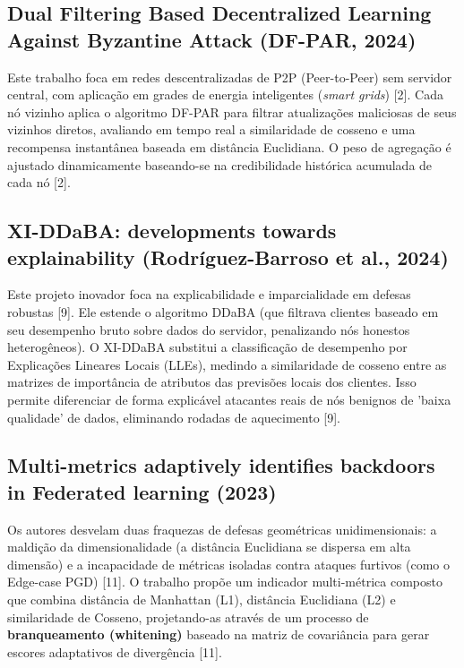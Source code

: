\documentclass[11pt,a4paper]{article}
\begin{document}
\subsection{Dual Filtering Based Decentralized Learning Against Byzantine Attack (DF-PAR, 2024)}
Este trabalho foca em redes descentralizadas de P2P (Peer-to-Peer) sem servidor central, com aplicação em grades de energia inteligentes (\textit{smart grids}) [2]. Cada nó vizinho aplica o algoritmo DF-PAR para filtrar atualizações maliciosas de seus vizinhos diretos, avaliando em tempo real a similaridade de cosseno e uma recompensa instantânea baseada em distância Euclidiana. O peso de agregação é ajustado dinamicamente baseando-se na credibilidade histórica acumulada de cada nó [2].

\subsection{XI-DDaBA: developments towards explainability (Rodríguez-Barroso et al., 2024)}
Este projeto inovador foca na explicabilidade e imparcialidade em defesas robustas [9]. Ele estende o algoritmo DDaBA (que filtrava clientes baseado em seu desempenho bruto sobre dados do servidor, penalizando nós honestos heterogêneos). O XI-DDaBA substitui a classificação de desempenho por Explicações Lineares Locais (LLEs), medindo a similaridade de cosseno entre as matrizes de importância de atributos das previsões locais dos clientes. Isso permite diferenciar de forma explicável atacantes reais de nós benignos de 'baixa qualidade' de dados, eliminando rodadas de aquecimento [9].

\subsection{Multi-metrics adaptively identifies backdoors in Federated learning (2023)}
Os autores desvelam duas fraquezas de defesas geométricas unidimensionais: a maldição da dimensionalidade (a distância Euclidiana se dispersa em alta dimensão) e a incapacidade de métricas isoladas contra ataques furtivos (como o Edge-case PGD) [11]. O trabalho propõe um indicador multi-métrica composto que combina distância de Manhattan (L1), distância Euclidiana (L2) e similaridade de Cosseno, projetando-as através de um processo de \textbf{branqueamento (whitening)} baseado na matriz de covariância para gerar escores adaptativos de divergência [11].
\end{document}
